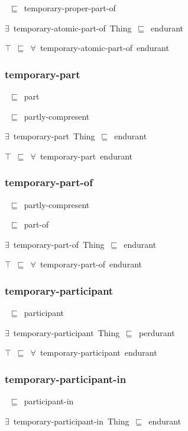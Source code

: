 \documentclass{article}
\begin{document}
~\ensuremath{\sqsubseteq}~temporary-proper-part-of

\ensuremath{\exists}~temporary-atomic-part-of~Thing~\ensuremath{\sqsubseteq}~endurant

\ensuremath{\top}~\ensuremath{\sqsubseteq}~\ensuremath{\forall}~temporary-atomic-part-of~endurant

\subsubsection*{temporary-part}

~\ensuremath{\sqsubseteq}~part

~\ensuremath{\sqsubseteq}~partly-compresent

\ensuremath{\exists}~temporary-part~Thing~\ensuremath{\sqsubseteq}~endurant

\ensuremath{\top}~\ensuremath{\sqsubseteq}~\ensuremath{\forall}~temporary-part~endurant

\subsubsection*{temporary-part-of}

~\ensuremath{\sqsubseteq}~partly-compresent

~\ensuremath{\sqsubseteq}~part-of

\ensuremath{\exists}~temporary-part-of~Thing~\ensuremath{\sqsubseteq}~endurant

\ensuremath{\top}~\ensuremath{\sqsubseteq}~\ensuremath{\forall}~temporary-part-of~endurant

\subsubsection*{temporary-participant}

~\ensuremath{\sqsubseteq}~participant

\ensuremath{\exists}~temporary-participant~Thing~\ensuremath{\sqsubseteq}~perdurant

\ensuremath{\top}~\ensuremath{\sqsubseteq}~\ensuremath{\forall}~temporary-participant~endurant

\subsubsection*{temporary-participant-in}

~\ensuremath{\sqsubseteq}~participant-in

\ensuremath{\exists}~temporary-participant-in~Thing~\ensuremath{\sqsubseteq}~endurant
\end{document}
